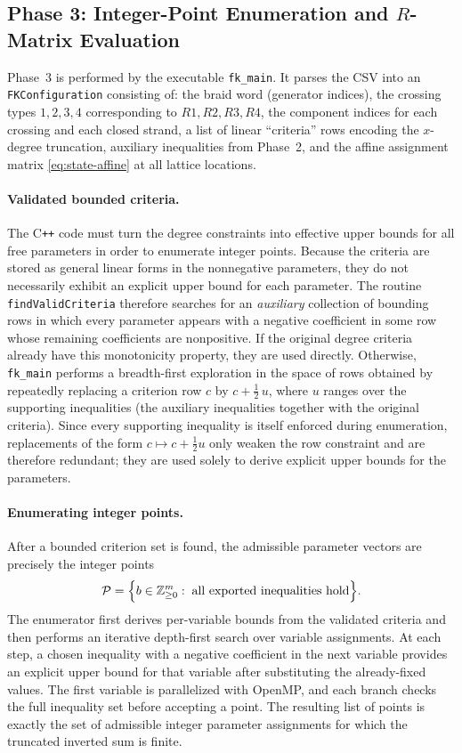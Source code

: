 \documentclass[twocolumn]{article}
\begin{document}
\subsection{Phase 3: Integer-Point Enumeration and $R$-Matrix Evaluation}

Phase~3 is performed by the executable \texttt{fk\_main}.
It parses the CSV into an \texttt{FKConfiguration} consisting of:
the braid word (generator indices), the crossing types \(1,2,3,4\) corresponding
to \(R1,R2,R3,R4\), the component indices for each crossing and each closed
strand, a list of linear ``criteria'' rows encoding the $x$-degree truncation,
auxiliary inequalities from Phase~2, and the affine assignment matrix
\eqref{eq:state-affine} at all lattice locations.

\paragraph{Validated bounded criteria.}
The C\texttt{++} code must turn the degree constraints into effective upper
bounds for all free parameters in order to enumerate integer points.
Because the criteria are stored as general linear forms in the nonnegative
parameters, they do not necessarily exhibit an explicit upper bound for each
parameter.
The routine \texttt{findValidCriteria} therefore searches for an \emph{auxiliary}
collection of bounding rows in which every parameter appears with a negative
coefficient in some row whose remaining coefficients are nonpositive.
If the original degree criteria already have this monotonicity property, they
are used directly.
Otherwise, \texttt{fk\_main} performs a breadth-first exploration in the space of
rows obtained by repeatedly replacing a criterion row \(c\) by
\(c+\tfrac12\,u\), where \(u\) ranges over the supporting inequalities (the
auxiliary inequalities together with the original criteria).
Since every supporting inequality is itself enforced during enumeration,
replacements of the form \(c\mapsto c+\tfrac12 u\) only weaken the row constraint
and are therefore redundant; they are used solely to derive explicit upper bounds
for the parameters.

\paragraph{Enumerating integer points.}
After a bounded criterion set is found, the admissible parameter vectors are
precisely the integer points
\begin{equation}\label{eq:polytope}
  \mathcal P=\Bigl\{b\in\mathbb Z_{\ge 0}^m:\;\text{all exported inequalities hold}\Bigr\}.
\end{equation}
The enumerator first derives per-variable bounds from the validated criteria and
then performs an iterative depth-first search over variable assignments.
At each step, a chosen inequality with a negative coefficient in the next
variable provides an explicit upper bound for that variable after substituting
the already-fixed values.
The first variable is parallelized with OpenMP, and each branch checks the full
inequality set before accepting a point.
The resulting list of points is exactly the set of admissible integer parameter
assignments for which the truncated inverted sum is finite.
\end{document}

